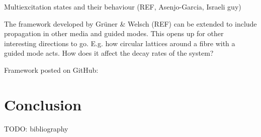 \documentclass{article}
\begin{document}
Multiexcitation states and their behaviour (REF, Asenjo-Garcia, Israeli guy)

The framework developed by Grüner \& Welsch (REF) can be extended to include propagation in other media and guided modes. This opens up for other interesting directions to go. E.g. how circular lattices around a fibre with a guided mode acts. How does it affect the decay rates of the system? 

Framework posted on GitHub: 

\section{Conclusion}

\newpage
TODO: bibliography
\end{document}
